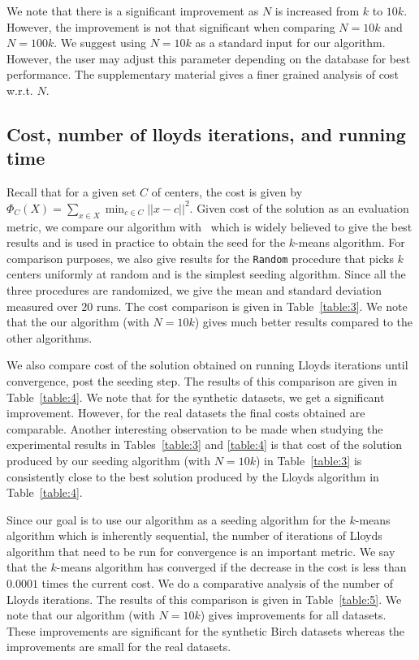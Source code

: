 We note that there is a significant improvement as $N$ is increased from $k$ to $10k$. 
However, the improvement is not that significant when comparing $N=10k$ and $N = 100k$.
We suggest using $N = 10k$ as a standard input for our algorithm. 
However, the user may adjust this parameter depending on the database for best performance. The supplementary material gives a finer grained analysis of cost w.r.t. $N$.










\subsection{Cost, number of lloyds iterations, and running time}
Recall that for a given set $C$ of centers, the cost is given by $\Phi_{C}(X) = \sum_{x \in X} \min_{c \in C} ||x - c||^2$.
Given cost of the solution as an evaluation metric, we compare our algorithm with \kmpp\  which is widely believed to give the best results and is used in practice to obtain the seed for the $k$-means algorithm. 
For comparison purposes, we also give results for the \texttt{Random} procedure that picks $k$ centers uniformly at random and is the simplest seeding algorithm.
Since all the three procedures are randomized, we give the mean and standard deviation measured over $20$ runs. 
The cost comparison is given in Table~\ref{table:3}.
We note that the our algorithm (with $N=10k$) gives much better results compared to the other algorithms.



We also compare cost of the solution obtained on running Lloyds iterations until convergence, post the seeding step.
The results of this comparison are given in Table~\ref{table:4}.
We note that for the synthetic datasets, we get a significant improvement. 
However, for the real datasets the final costs obtained are comparable.
Another interesting observation to be made when studying the experimental results in Tables~\ref{table:3} and \ref{table:4} is that cost of the solution produced by our seeding algorithm (with $N = 10k$) in Table~\ref{table:3} is consistently close to the best solution produced by the Lloyds algorithm in Table~\ref{table:4}.



Since our goal is to use our algorithm as a seeding algorithm for the $k$-means algorithm which is inherently sequential, the number of iterations of Lloyds algorithm that need to be run for convergence is an important metric. 
We say that the $k$-means algorithm has converged if the decrease in the cost is less than $0.0001$ times the current cost.
We do a comparative analysis of the number of Lloyds iterations.
The results of this comparison is given in Table~\ref{table:5}.
We note that our algorithm (with $N=10k$) gives improvements for all datasets.
These improvements are significant for the synthetic Birch datasets whereas the improvements are small for the real datasets.

